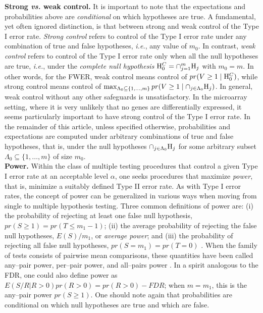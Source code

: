 \documentclass[11pt]{article}
\begin{document}
{\bf Strong {\it vs.} weak control.} It is important to note that the
expectations and probabilities above are {\it conditional} on which
hypotheses are true. A fundamental,
yet often ignored distinction, is that between strong and weak control
of the Type I error rate. {\it Strong control} refers to control of
the Type I error rate under any combination of true and false
hypotheses, {\it i.e.}, any value of $m_0$. In contrast, {\it weak
  control} refers to control of the Type I error rate only when all
the null hypotheses are true, {\it i.e.}, under the {\it complete null
  hypothesis} ${\rm H}_0^C = \cap_{j=1}^m {\rm H}_j$ with $m_0=m$. In
other words, for the FWER, weak control means control of $pr(V\geq 1
\mid {\rm H}_0^C)$, while strong control means control of $\max_{\Lambda_0
  \subseteq \{1, \ldots, m\}} pr(V\geq 1 \mid \cap_{j \in \Lambda_0} {\rm
  H}_j)$. In general, weak control without any other safeguards is
unsatisfactory. In the microarray setting, where it is very unlikely
that no genes are differentially expressed, it seems
particularly important to have strong control of the Type I error
rate.  In the remainder of this article, unless specified otherwise,
 probabilities and expectations are computed under arbitrary combinations
of true and false hypotheses, that is, under the null hypotheses $\cap_{j \in \Lambda_0} {\rm
  H}_j$ for some arbitrary subset $\Lambda_0 \subseteq \{1, \ldots,
m\}$ of size $m_0$.\\

{\bf Power.} Within the class of multiple testing procedures that
control a given Type I error rate at an acceptable level $\alpha$, one
seeks procedures that maximize {\it power}, that is, minimize a
suitably defined Type II error rate. As with Type I error rates, the
concept of power can be generalized in various ways when moving from
single to multiple hypothesis testing. Three common definitions of
power are: (i) the probability of rejecting at least one false null
hypothesis, $pr(S \geq 1) = pr(T \leq m_1-1)$; (ii) the average
probability of rejecting the false null hypotheses, $E(S)/m_1$, or {\it
  average power}; and (iii) the probability of rejecting all false
null 
hypotheses, $pr(S=m_1) = pr(T=0)$ \citep{Shaffer95}. When the family of
tests consists of pairwise mean comparisons, these quantities have
been called any--pair power, per--pair power, and all--pairs power
\citep{Ramsey78}. In a spirit analogous to the FDR, one
could also define power as $E(S/R|R>0)pr(R>0) = pr(R>0)-FDR$; when $m=m_1$, this is
the any--pair power $pr(S \geq 1)$. One should note again that
probabilities are conditional on which null hypotheses are true and
which are false.\\
\end{document}
